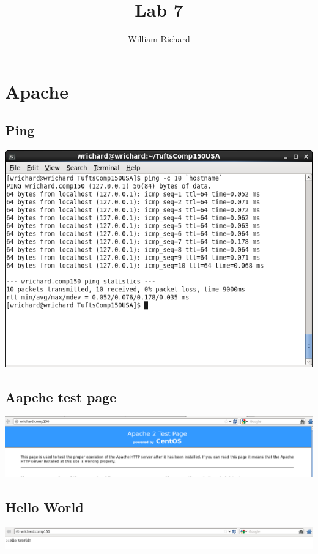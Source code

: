 \documentclass[a4paper,10pt]{article}
\title{Lab 7}
\author{William Richard}
\begin{document}
\maketitle

\section{Apache}
\subsection{Ping}
  \begin{center}
  \includegraphics[width=\linewidth]{./ping.png}
  \end{center}
\subsection{Aapche test page}
\begin{center}
  \includegraphics[width=\linewidth]{./apache_test_page.png}
  \end{center}
\subsection{Hello World}
\begin{center}
  \includegraphics[width=\linewidth]{./hello_world.png}
  \end{center}
\end{document}
